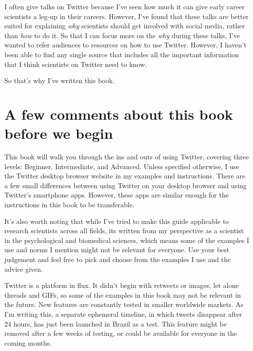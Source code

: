 \documentclass[
]{book}
\begin{document}
I often give talks on Twitter because I've seen how much it can give early career scientists a leg-up in their careers. However, I've found that these talks are better suited for explaining \emph{why} scientists should get involved with social media, rather than \emph{how} to do it. So that I can focus more on the \emph{why} during these talks, I've wanted to refer audiences to resources on how to use Twitter. However, I haven't been able to find any single source that includes all the important information that I think scientists on Twitter need to know.

So that's why I've written this book.

\hypertarget{a-few-comments-about-this-book-before-we-begin}{%
\section*{A few comments about this book before we begin}\label{a-few-comments-about-this-book-before-we-begin}}

This book will walk you through the ins and outs of using Twitter, covering three levels: Beginner, Intermediate, and Advanced. Unless specified otherwise, I use the Twitter desktop browser website in my examples and instructions. There are a few small differences between using Twitter on your desktop browser and using Twitter's smartphone apps. However, these apps are similar enough for the instructions in this book to be transferable.

It's also worth noting that while I've tried to make this guide applicable to research scientists across all fields, its written from my perspective as a scientist in the psychological and biomedical sciences, which means some of the examples I use and norms I mention might not be relevant for everyone. Use your best judgement and feel free to pick and choose from the examples I use and the advice given.

Twitter is a platform in flux. It didn't begin with retweets or images, let alone threads and GIFs, so some of the examples in this book may not be relevant in the future. New features are constantly tested in smaller worldwide markets. As I'm writing this, a separate ephemeral timeline, in which tweets disappear after 24 hours, has just been launched in Brazil as a test. This feature might be removed after a few weeks of testing, or could be available for everyone in the coming months.
\end{document}
